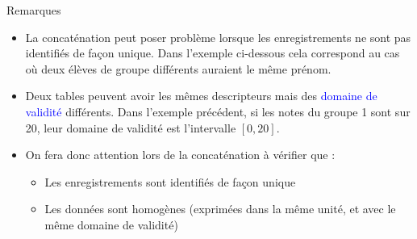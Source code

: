 \documentclass[10pt]{beamer}
\begin{document}
\begin{frame}
    \mframe{\FT}
    \begin{block}{Remarques}
        \begin{itemize}
            \item<1-> La concaténation peut poser problème lorsque les enregistrements ne sont pas identifiés de façon  unique. Dans l'exemple ci-dessous cela correspond au cas où deux élèves de groupe différents auraient le même prénom.
            \item<2-> Deux tables peuvent avoir les mêmes descripteurs mais des \textcolor{blue}{domaine de validité} différents. Dans l'exemple précédent, si les notes du groupe 1 sont sur 20, leur domaine de validité est l'intervalle $[0,20]$.
            \item<3-> On fera donc attention lors de la concaténation à vérifier que :
            \begin{itemize}
                \item <4-> Les enregistrements sont identifiés de façon unique
                \item <5-> Les données sont homogènes (exprimées dans la même unité, et avec le même domaine de validité)
            \end{itemize}
        \end{itemize}
    \end{block}
\end{frame}
\end{document}
